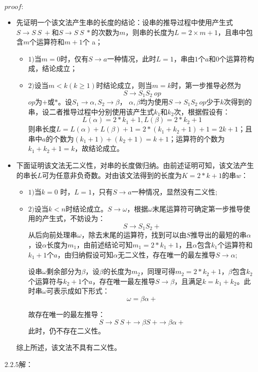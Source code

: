 \documentclass[UTF8,noindent]{ctexart}
\begin{document}
$proof:$
\begin{itemize}
	\item 先证明一个该文法产生串的长度的结论：设串的推导过程中使用产生式$S\rightarrow S\ S\ +$和$S\rightarrow S\ S\ *$的次数为$m$，则串的长度为$L = 2\times m + 1$，且串中包含$m$个运算符和$m+1$个 a；
\begin{itemize}
  \item $1)$当$m=0$时，仅有$S\rightarrow a$一种情况，此时$L=1$，串由$1$个$a$和$0$个运算符构成，结论成立；
\item $2)$设当$m<k(k\ge 1)$时结论成立，则当$m=k$时，第一步推导必然为
\[S\rightarrow S_1S_2\ op\]
$op$为$+$或$*$。设$S_1\rightarrow \alpha, S_2\rightarrow \beta$， $\alpha, \beta$均为使用$S\rightarrow S_1S_2\ op$少于$k$次得到的串，设二者推导过程中分别使用该产生式$k_1$和$k_2$次，根据假设有：
\[L(\alpha) = 2*k_1 + 1, L(\beta) = 2*k_2+1\]
则串长度$L = L(\alpha) + L(\beta) + 1 = 2*(k_1+k_2+ 1) + 1= 2k+1$；且串中$a$的个数为$(k_1+1) + (k_2+1) = k+1$；运算符的个数为$k_1+k_2+1= k$，故结论成立。
\end{itemize}
\item 下面证明该文法无二义性，对串的长度做归纳。由前述证明可知，该文法产生的串长$L$可为任意非负奇数。对由该文法得到的长度为$K = 2*k+1$的串$w$：
  \begin{itemize}
	\item $1)$当$k=0$ 时，$L=1$，只有$S\rightarrow a$一种情况，显然没有二义性;
  \item $2)$设当$k<n$时结论成立。$S\rightarrow \omega$，根据$\omega$末尾运算符可确定第一步推导使用的产生式，不妨设为：
	\[S\rightarrow S_1S_2+\]
  从后向前处理串$\omega$，除去末尾的运算符，找到可以由$S$推导出的最短的串$\alpha$，设$\alpha$长度为$m_1$，由前述结论可知$m_1 = 2*k_1+1$，且$\alpha$包含$k_1$个运算符和$k_1+1$个$a$，由归纳假设可知$\alpha$无二义性，存在唯一的最左推导$S\rightarrow \alpha$;

  设串$\omega$剩余部分为$\beta$，设$\beta$的长度为$m_2$，同理可得$m_2 = 2*k_2+1$，$\beta$包含$k_2$个运算符与$k_2+1$个$a$，存在唯一最左推导$S\rightarrow \beta$，且满足$k = k_1+ k_2$。此时串$\omega$可表示成如下形式：
  \[\omega = \beta\alpha +\]

  故存在唯一的最左推导：
  \[S\rightarrow S\ S\ +\rightarrow \beta S\ + \rightarrow \beta \alpha +\]
  此时，仍不存在二义性。
  \end{itemize}
综上所述，该文法不具有二义性。
\end{itemize}


$2.2.5$解：
\end{document}
